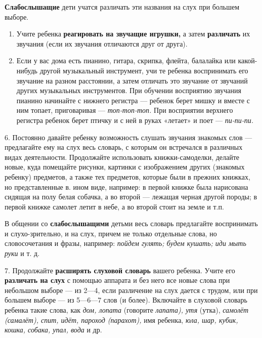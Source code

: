\documentclass[a5paper]{book}
\renewcommand{\emph}[1]{\textit{#1}}
\begin{document}
\textbf{Слабослышащие} дети учатся различать эти названия на слух при
большем выборе.


\begin{enumerate}
\def\labelenumi{\arabic{enumi}.}
\setcounter{enumi}{3}
\item
  
  Учите ребенка \textbf{реагировать на звучащие игрушки,} а затем
  \textbf{различать} их звучания (если их звучания отличаются друг от
  друга).
  
\item
  
  Если у вас дома есть пианино, гитара, скрипка, флейта, балалайка или
  какой-нибудь другой музыкальный инструмент, учи те ребенка
  воспринимать его звучание на разном расстоянии, а затем отличать это
  звучание от звучаний других музыкальных инструментов. При обучении
  восприятию звучания пианино начинайте с нижнего регистра --- ребенок
  берет мишку и вместе с ним топает, приговаривая ---
  \emph{топ-топ-топ.} При восприятии верхнего регистра ребенок берет
  птичку и с ней в руках «летает» и поет --- \emph{пи-пи-пи.}
  
\end{enumerate}


6. Постоянно давайте ребенку возможность слушать звучания знакомых слов
--- предлагайте ему на слух весь словарь, с которым он встречался в
различных видах деятельности. Продолжайте использовать книжки-самоделки,
делайте новые, куда помещайте рисунки, картинки с изображением других
(знакомых ребенку) предметов, а также тех предметов, которые были в
прежних книжках, но представленные в. ином виде, например: в первой
книжке была нарисована сидящая на полу белая собачка, а во второй ---
лежащая черная другой породы; в первой книжке самолет летит в небе, а во
второй стоит на земле и т.п.

В общении со \textbf{слабослышащими} детьми весь словарь предлагайте
воспринимать и слухо-зрительно, и на слух, причем не только отдельные
слова, но словосочетания и фразы, например: \emph{пойдем гулять; будем
кушать; иди мыть руки} и т. д.

7. Продолжайте \textbf{расширять слуховой словарь} вашего ребенка. Учите
его \textbf{различать на слух} с помощью аппарата и без него все новые
слова при небольшом выборе --- из 2---4, если различение на слух дается
с трудом, или при большем выборе --- из 5---6---7 слов (и более).
Включайте в слуховой словарь ребенка такие слова, как \emph{дом, лопата}
(говорите \emph{лапата), утя} (утка), \emph{самолёт (самалёт), спит,
идёт, пароход (парахот),} имя ребенка, \emph{юла, шар, кубик, кошка,
собака, упал, вода} и др.
\end{document}
